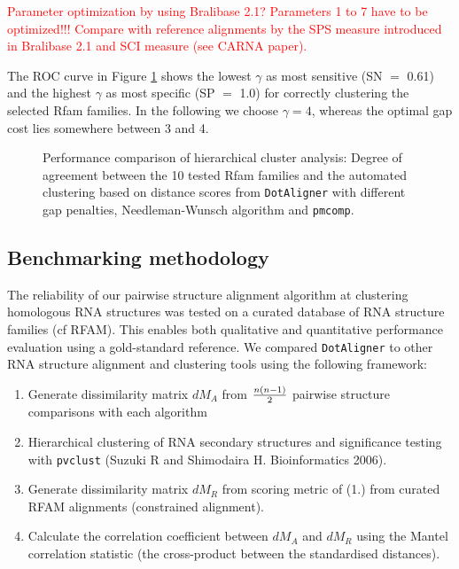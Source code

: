 \documentclass[a4paper,twoside]{article}
\newcommand\dotaligner{\texttt{DotAligner}}
\newcommand\pmcomp{\texttt{pmcomp}}
\newcommand\pvclust{\texttt{pvclust}}
\newcommand{\RED}[1]{\textcolor{red}{#1}}
\newcommand{\GRAY}[1]{\textcolor{mygray}{#1}}
\begin{document}
\RED{Parameter optimization by using Bralibase 2.1? Parameters 1 to 7 have to
be optimized!!! Compare with reference alignments by the SPS measure introduced
in Bralibase 2.1 and SCI measure (see CARNA paper).}

\GRAY{The ROC curve in Figure \ref{fig:roc} shows the lowest $\gamma$ as most
sensitive (SN $=$ 0.61) and the highest $\gamma$ as most specific (SP
$=$ 1.0) for correctly clustering the selected Rfam families. In the
following we choose $\gamma=4$, whereas the optimal gap cost lies
somewhere between 3 and 4.}

\begin{figure}[!h]
  \centering
  {}
  \caption{\GRAY{Performance comparison of hierarchical cluster analysis: Degree of
  agreement between the 10 tested Rfam families and the automated clustering
  based on distance scores from \dotaligner{} with different gap penalties,
  Needleman-Wunsch algorithm and \pmcomp{}.}}
  \label{fig:roc}
\end{figure}



\subsection{Benchmarking methodology} 

\noindent The reliability of our pairwise structure alignment algorithm at
clustering homologous RNA structures was tested on a curated database of RNA
structure families (cf RFAM). This enables both qualitative and quantitative
performance evaluation using a gold-standard reference. We compared
\texttt{DotAligner} to other RNA structure alignment and clustering tools using
the following framework: 

\begin{enumerate}
\item Generate dissimilarity matrix $dM_A$ from ${n(n-1)}\over{2}$ pairwise structure comparisons with each algorithm
\item Hierarchical clustering of RNA secondary structures and significance testing with \pvclust{} (Suzuki R and Shimodaira H. Bioinformatics 2006).
\item Generate dissimilarity matrix $dM_R$ from scoring metric of (1.) from curated RFAM alignments (constrained alignment). 
\item Calculate the correlation coefficient between $dM_A$ and $dM_R$ using the Mantel correlation statistic (the cross-product between the standardised distances). 
\end{enumerate}
\end{document}
